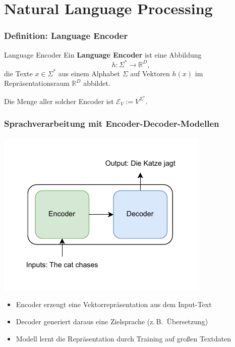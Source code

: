 \section{Natural Language Processing}
\frame{\tableofcontents[currentsection]}
\begingroup
\frametitle{Definition: Language Encoder}

\begin{frame}
	\begin{block}{Language Encoder}
		\small
		Ein \textbf{Language Encoder} ist eine Abbildung
		\[
		h : \Sigma^* \rightarrow \mathbb{R}^D,
		\]
		die Texte \(x \in \Sigma^*\) aus einem Alphabet \(\Sigma\) auf Vektoren \(h(x)\) im Repräsentationsraum \(\mathbb{R}^D\) abbildet.
		
		\vspace{0.3em}
		Die Menge aller solcher Encoder ist \(\mathcal{E}_V := V^{\Sigma^*}\).
		
	\end{block}
\end{frame}

\endgroup


\begingroup
\frametitle{Sprachverarbeitung mit Encoder-Decoder-Modellen}
\begin{frame}
	\centering
	\includegraphics[width=0.4\linewidth]{BilderPräsentation/encoder_decoder.pdf}
	
	\begin{itemize}
		\item Encoder erzeugt eine Vektorrepräsentation aus dem Input-Text
		\item Decoder generiert daraus eine Zielsprache (z.\,B.\ Übersetzung)
		\item Modell lernt die Repräsentation durch Training auf großen Textdaten
	\end{itemize}
\end{frame}


\endgroup
